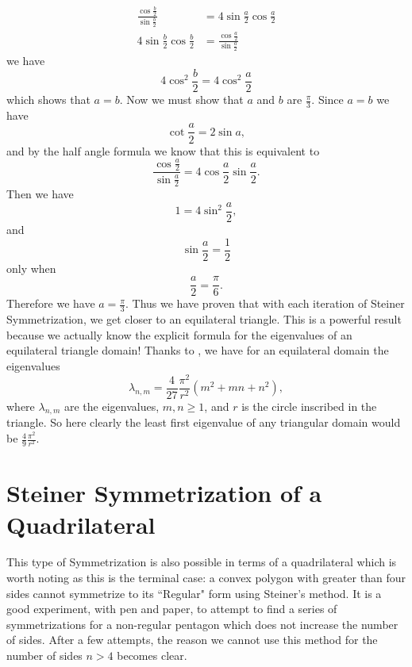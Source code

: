 \documentclass[12pt]{report}
\numberwithin{definition}{section}
\begin{document}
    \begin{align*}
    \frac{\cos{\frac{b}{2}}}{\sin{\frac{b}{2}}} &= 4\sin{\frac{a}{2}}\cos{\frac{a}{2}}\\
    4\sin{\frac{b}{2}}\cos{\frac{b}{2}} & = \frac{\cos{\frac{a}{2}}}{\sin{\frac{a}{2}}}
\end{align*}
we have 
\[
4\cos^2{\frac{b}{2}}=4\cos^2{\frac{a}{2}}
\]
which shows that $a=b$. Now we must show that $a$ and $b$ are $\frac{\pi}{3}$. 
Since $a=b$ we have 
\[
\cot{\frac{a}{2}} = 2\sin{a},
\]
and by the half angle formula we know that this is equivalent to 
\[
\frac{\cos{\frac{a}{2}}}{\sin{\frac{a}{2}}} = 4\cos{\frac{a}{2}}\sin{\frac{a}{2}}.
\]
Then we have 
\[
1 = 4 \sin^2{\frac{a}{2}},
\]
and 
\[
\sin{\frac{a}{2}} = \frac{1}{2}
\]
only when 
\[
\frac{a}{2} = \frac{\pi}{6}.
\]
Therefore we have $a =\frac{\pi}{3}$.
Thus we have proven that with each iteration of Steiner Symmetrization, we get closer  to an equilateral triangle. This is a powerful result because we actually know the explicit formula for the eigenvalues of an equilateral triangle domain! Thanks to \cite{McCartin}, we have for an equilateral domain the eigenvalues 
\[
\lambda_{n,m} = \frac{4}{27}\frac{\pi^2}{r^2}(m^2+mn+n^2),
\]
where $\lambda_{n,m}$ are the eigenvalues,  $m,n \geq 1$, and $r$ is the circle inscribed in the triangle. So here clearly the least first eigenvalue of any triangular domain would be $\frac{4}{9}\frac{\pi^2}{r^2}$.


\break






\section {Steiner Symmetrization of a Quadrilateral}

	\hspace{4mm}  This type of Symmetrization is also possible in terms of a quadrilateral which is worth noting as this is the terminal case: a convex polygon with greater than four sides cannot symmetrize to its ``Regular" form using Steiner's method. It is a good experiment, with pen and paper, to attempt to find a series of symmetrizations for a non-regular pentagon which does not increase the number of sides. After a few attempts, the reason we cannot use this method for the number of sides $n>4$ becomes clear. 
	

	    
	    
\end{document}
